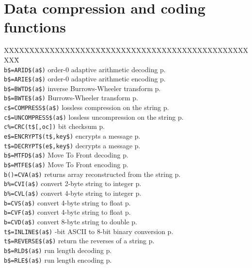 \section{Data compression and coding functions}
\begin{tabbing}
XXXXXXXXXXXXXXXXXXX\=XXXXXXXXXXXXXXXXXXXXXXXXXXXXXXXX\=\kill\\
\verb|b$=ARID$(a$)|  	\> order-0 adaptive arithmetic decoding\> p.\pageref{ARIDS}\\
\verb|b$=ARIE$(a$)|  	\> order-0 adaptive arithmetic encoding\> p.\pageref{ARIES}\\
\verb|b$=BWTD$(a$)|  	\>inverse Burrows-Wheeler transform\> p.\pageref{BWTDS}\\
\verb|b$=BWTE$(a$)|  	\>Burrows-Wheeler transform\> p.\pageref{BWTES}\\
\verb|c$=COMPRESS$(a$)|  \>lossless compression on the string\> p.\pageref{COMPRESSS}\\
\verb|c$=UNCOMPRESS$(a$)|  \>lossless uncompression on the string\> p.\pageref{UNCOMPRESSS}\\

\verb|c%=CRC(t$[,oc])|   bit checksum\> p.\pageref{CRC}\\
\verb|e$=ENCRYPT$(t$,key$)|  	\>encrypts a message\> p.\pageref{ENCRYPTS}\\
\verb|t$=DECRYPT$(e$,key$)|  	\>decrypts a message\> p.\pageref{DECRYPTS}\\
\verb|b$=MTFD$(a$)|  	\>Move To Front decoding\> p.\pageref{MTFDS}\\
\verb|b$=MTFE$(a$)|  	\>Move To Front encoding\> p.\pageref{MTFES}\\
\verb|b()=CVA(a$)|  	\> returns array reconstructed from the string\> p.\pageref{CVA}\\
\verb|b%=CVI(a$)|	\> convert 2-byte string to integer\> p.\pageref{CVI}\\
\verb|b%=CVL(a$)|	\> convert 4-byte string to integer\> p.\pageref{CVL}\\
\verb|b=CVS(a$)|	\> convert 4-byte string to float\> p.\pageref{CVS}\\
\verb|b=CVF(a$)|	\> convert 4-byte string to float\> p.\pageref{CVF}\\
\verb|b=CVD(a$)|	\> convert 8-byte string to double\> p.\pageref{CVD}\\

\verb|t$=INLINE$(a$)|  	-bit ASCII to 8-bit binary conversion\> p.\pageref{INLINES}\\
\verb|t$=REVERSE$(a$)| \>  return the reverses of a string\> p.\pageref{REVERSES}\\
\verb|b$=RLD$(a$)|  	\> run length decoding\> p.\pageref{RLDS}\\
\verb|b$=RLE$(a$)|  	\> run length encoding\> p.\pageref{RLES}\\


\end{tabbing}

